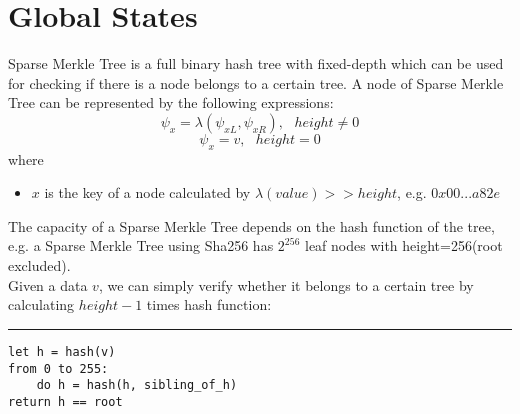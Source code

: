\documentclass[a4paper,12pt]{article}
\begin{document}
\section{Global States}
\label{sec:org9b71832}
Sparse Merkle Tree is a full binary hash tree with fixed-depth which can be used for checking if there is a node belongs to a certain tree. A node of Sparse Merkle Tree can be represented by the following expressions:\\
\begin{equation*}
    \psi_{x} = \lambda(\psi_{xL}, \psi_{xR}), \text{ } height \ne 0
\end{equation*}
\begin{equation*}
    \psi_{x} = v, \text{ } height = 0
\end{equation*}
where\\
\begin{itemize}
    \item $x$ is the key of a node calculated by $\lambda(value) >> height$, e.g. $0x00...a82e$
\end{itemize}
The capacity of a Sparse Merkle Tree depends on the hash function of the tree, e.g. a Sparse Merkle Tree using Sha256 has \(2^{256}\) leaf nodes with height=256(root excluded).\\
Given a data \(v\), we can simply verify whether it belongs to a certain tree by calculating \(height-1\) times hash function:\\

\noindent\rule{\textwidth}{0.5pt}
\begin{verbatim}
let h = hash(v)
from 0 to 255:
    do h = hash(h, sibling_of_h)
return h == root
\end{verbatim}
\end{document}
